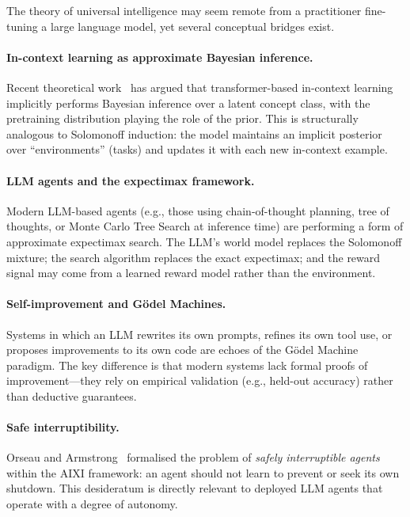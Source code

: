 \documentclass[11pt,a4paper]{article}
\theoremstyle{definition}
\theoremstyle{remark}
\begin{document}
The theory of universal intelligence may seem remote from a practitioner
fine-tuning a large language model, yet several conceptual bridges exist.

\paragraph{In-context learning as approximate Bayesian inference.}
Recent theoretical work~\cite{Xie2022,Muller2022} has argued that
transformer-based in-context learning implicitly performs Bayesian inference
over a latent concept class, with the pretraining distribution playing the
role of the prior.  This is structurally analogous to Solomonoff induction:
the model maintains an implicit posterior over ``environments'' (tasks) and
updates it with each new in-context example.

\paragraph{LLM agents and the expectimax framework.}
Modern LLM-based agents (e.g., those using chain-of-thought planning, tree
of thoughts, or Monte Carlo Tree Search at inference time) are performing
a form of approximate expectimax search.  The LLM's world model replaces
the Solomonoff mixture; the search algorithm replaces the exact expectimax;
and the reward signal may come from a learned reward model rather than
the environment.

\paragraph{Self-improvement and G\"odel Machines.}
Systems in which an LLM rewrites its own prompts, refines its own tool use,
or proposes improvements to its own code are echoes of the G\"odel Machine
paradigm.  The key difference is that modern systems lack formal proofs of
improvement---they rely on empirical validation (e.g., held-out accuracy)
rather than deductive guarantees.

\paragraph{Safe interruptibility.}
Orseau and Armstrong~\cite{Orseau2016} formalised the problem of
\emph{safely interruptible agents} within the AIXI framework: an agent
should not learn to prevent or seek its own shutdown.  This desideratum
is directly relevant to deployed LLM agents that operate with a degree
of autonomy.
\end{document}
